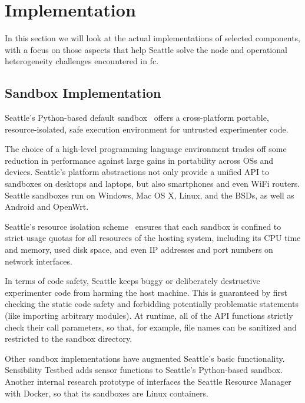 \section{Implementation}

In this section we will look at the actual implementations of
selected components, with a focus on those aspects that help
Seattle solve the node and operational heterogeneity
challenges encountered in \gls{fc}.

\subsection{Sandbox Implementation}

Seattle's Python-based default sandbox~\cite{RepySandbox}
offers a cross-platform portable, resource-isolated,
safe execution environment for untrusted experimenter code.

The choice of a high-level programming language environment trades
off some reduction in performance against large gains in portability
across \glspl{OS} and devices. Seattle's platform abstractions not only
provide a unified \gls{API} to sandboxes on desktops and laptops,
but also smartphones and even WiFi routers. Seattle sandboxes
run on Windows, Mac OS X, Linux, and the \glspl{BSD}, as
well as Android and OpenWrt.

Seattle's resource isolation scheme~\cite{li2015fence} ensures
that each sandbox is confined to strict usage quotas for all
resources of the hosting system, including its \gls{CPU} time and
memory, used disk space, and even \gls{IP} addresses and port numbers
on network interfaces.

In terms of code safety, Seattle keeps buggy or deliberately destructive
experimenter code from harming the host machine. This is guaranteed
by first checking the static code safety and forbidding potentially
problematic statements (like importing arbitrary modules). At runtime,
all of the \gls{API} functions strictly check their call parameters,
so that, for example, file names can be sanitized and restricted to the
sandbox directory.

Other sandbox implementations have augmented Seattle's basic functionality.
Sensibility Testbed adds sensor functions to Seattle's Python-based
sandbox. Another internal research prototype of interfaces the
Seattle Resource Manager with Docker, so that its sandboxes are
Linux containers.

